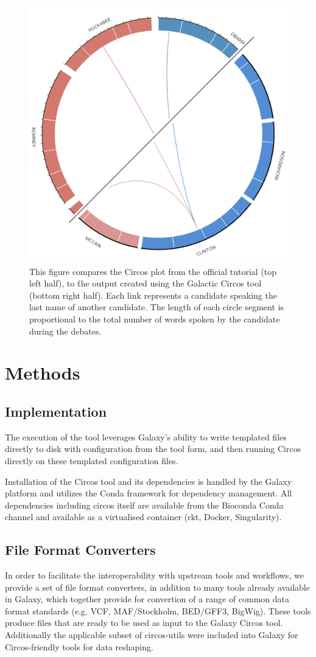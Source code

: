 \begin{figure}[h!]
\centering
\includegraphics[width=0.6\linewidth]{chapters/images/circos/plot-politics-both.png}
\caption{This figure compares the Circos plot from the official tutorial (top left half), to ťhe output created using the Galactic Circos tool (bottom right half). Each link represents a candidate speaking the last name of another candidate. The length of each circle segment is proportional to the total number of words spoken by the candidate during the debates.}
\label{figure:debate}
\end{figure}

\section*{Methods}

\subsection*{Implementation}
The execution of the tool leverages Galaxy's ability to write templated files directly to disk with configuration from the tool form, and then running Circos directly on these templated configuration files.

Installation of the Circos tool and its dependencies is handled by the Galaxy platform and utilizes the Conda framework for dependency management. All dependencies including circos itself are available from the Bioconda Conda channel \cite{gruning2018bioconda} and available as a virtualised container (rkt, Docker, Singularity).

\subsection*{File Format Converters}
In order to facilitate the interoperability with upstream tools and workflows, we provide a set of file format converters, in addition to many tools already available in Galaxy, which together provide for convertion of a range of common data format standards (e.g. VCF, MAF/Stockholm, BED/GFF3, BigWig). These tools produce files that are ready to be used as input to the Galaxy Circos tool. Additionally the applicable subset of circos-utils were included into Galaxy for Circos-friendly tools for data reshaping.

